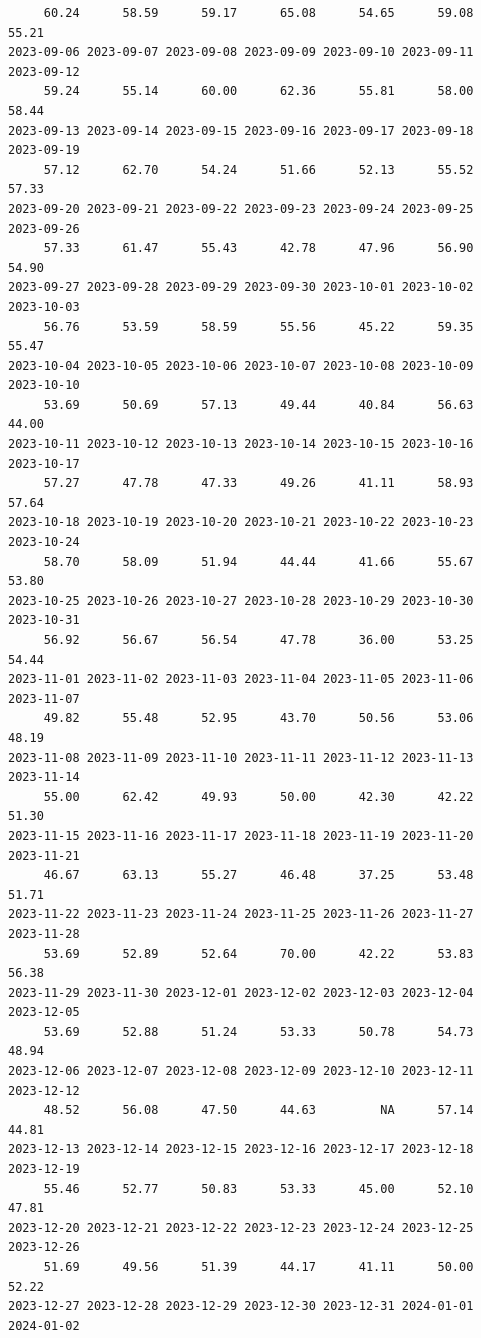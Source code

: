 \documentclass[
  letterpaper,
  DIV=11,
  numbers=noendperiod]{scrartcl}
\begin{document}
\begin{verbatim}
     60.24      58.59      59.17      65.08      54.65      59.08      55.21 
2023-09-06 2023-09-07 2023-09-08 2023-09-09 2023-09-10 2023-09-11 2023-09-12 
     59.24      55.14      60.00      62.36      55.81      58.00      58.44 
2023-09-13 2023-09-14 2023-09-15 2023-09-16 2023-09-17 2023-09-18 2023-09-19 
     57.12      62.70      54.24      51.66      52.13      55.52      57.33 
2023-09-20 2023-09-21 2023-09-22 2023-09-23 2023-09-24 2023-09-25 2023-09-26 
     57.33      61.47      55.43      42.78      47.96      56.90      54.90 
2023-09-27 2023-09-28 2023-09-29 2023-09-30 2023-10-01 2023-10-02 2023-10-03 
     56.76      53.59      58.59      55.56      45.22      59.35      55.47 
2023-10-04 2023-10-05 2023-10-06 2023-10-07 2023-10-08 2023-10-09 2023-10-10 
     53.69      50.69      57.13      49.44      40.84      56.63      44.00 
2023-10-11 2023-10-12 2023-10-13 2023-10-14 2023-10-15 2023-10-16 2023-10-17 
     57.27      47.78      47.33      49.26      41.11      58.93      57.64 
2023-10-18 2023-10-19 2023-10-20 2023-10-21 2023-10-22 2023-10-23 2023-10-24 
     58.70      58.09      51.94      44.44      41.66      55.67      53.80 
2023-10-25 2023-10-26 2023-10-27 2023-10-28 2023-10-29 2023-10-30 2023-10-31 
     56.92      56.67      56.54      47.78      36.00      53.25      54.44 
2023-11-01 2023-11-02 2023-11-03 2023-11-04 2023-11-05 2023-11-06 2023-11-07 
     49.82      55.48      52.95      43.70      50.56      53.06      48.19 
2023-11-08 2023-11-09 2023-11-10 2023-11-11 2023-11-12 2023-11-13 2023-11-14 
     55.00      62.42      49.93      50.00      42.30      42.22      51.30 
2023-11-15 2023-11-16 2023-11-17 2023-11-18 2023-11-19 2023-11-20 2023-11-21 
     46.67      63.13      55.27      46.48      37.25      53.48      51.71 
2023-11-22 2023-11-23 2023-11-24 2023-11-25 2023-11-26 2023-11-27 2023-11-28 
     53.69      52.89      52.64      70.00      42.22      53.83      56.38 
2023-11-29 2023-11-30 2023-12-01 2023-12-02 2023-12-03 2023-12-04 2023-12-05 
     53.69      52.88      51.24      53.33      50.78      54.73      48.94 
2023-12-06 2023-12-07 2023-12-08 2023-12-09 2023-12-10 2023-12-11 2023-12-12 
     48.52      56.08      47.50      44.63         NA      57.14      44.81 
2023-12-13 2023-12-14 2023-12-15 2023-12-16 2023-12-17 2023-12-18 2023-12-19 
     55.46      52.77      50.83      53.33      45.00      52.10      47.81 
2023-12-20 2023-12-21 2023-12-22 2023-12-23 2023-12-24 2023-12-25 2023-12-26 
     51.69      49.56      51.39      44.17      41.11      50.00      52.22 
2023-12-27 2023-12-28 2023-12-29 2023-12-30 2023-12-31 2024-01-01 2024-01-02 

\end{verbatim}
\end{document}
